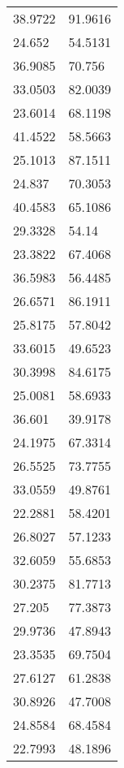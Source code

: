 \documentclass[bwprint]{gmcmthesis}
\begin{document}
\begin{longtable}{ll}
38.9722           & 91.9616            \\
24.652            & 54.5131            \\
36.9085           & 70.756             \\
33.0503           & 82.0039            \\
23.6014           & 68.1198            \\
41.4522           & 58.5663            \\
25.1013           & 87.1511            \\
24.837            & 70.3053            \\
40.4583           & 65.1086            \\
29.3328           & 54.14              \\
23.3822           & 67.4068            \\
36.5983           & 56.4485            \\
26.6571           & 86.1911            \\
25.8175           & 57.8042            \\
33.6015           & 49.6523            \\
30.3998           & 84.6175            \\
25.0081           & 58.6933            \\
36.601            & 39.9178            \\
24.1975           & 67.3314            \\
26.5525           & 73.7755            \\
33.0559           & 49.8761            \\
22.2881           & 58.4201            \\
26.8027           & 57.1233            \\
32.6059           & 55.6853            \\
30.2375           & 81.7713            \\
27.205            & 77.3873            \\
29.9736           & 47.8943            \\
23.3535           & 69.7504            \\
27.6127           & 61.2838            \\
30.8926           & 47.7008            \\
24.8584           & 68.4584            \\
22.7993           & 48.1896            \\

\end{longtable}
\end{document}
